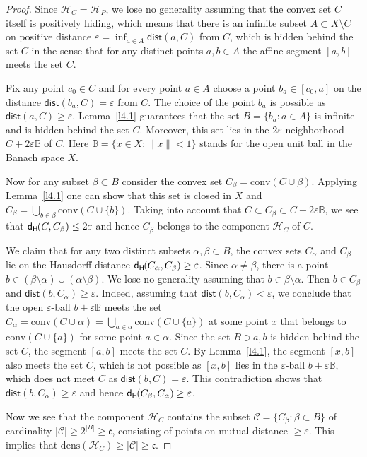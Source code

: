 \documentclass{amsart}
\newcommand{\IB}{\mathbb B}
\newcommand{\e}{\varepsilon}
\newcommand{\HH}{\mathcal H}
\newcommand{\dens}{\mathrm{dens}}
\newcommand{\conv}{\mathrm{conv}}
\newcommand{\dist}{\mathsf{dist}}
\newcommand{\dH}{\mathsf{d}_{\mathsf H}\kern-1pt}
\theoremstyle{definition}
\begin{document}
\begin{proof} Since $\HH_C=\HH_P$, we lose no generality assuming that the convex set $C$ itself is positively hiding, which means that there is an infinite subset $A\subset X\setminus C$ on positive distance $\e=\inf_{a\in A}\dist(a,C)$ from $C$, which is hidden behind the set $C$ in the sense that for any distinct points $a,b\in A$ the affine segment $[a,b]$ meets the set $C$.

Fix any point $c_0\in C$ and for every point $a\in A$ choose a point $b_a\in[c_0,a]$ on the distance $\dist(b_a,C)=\e$ from $C$. The choice of the point $b_a$ is possible as $\dist(a,C)\ge\e$. Lemma~\ref{l4.1} guarantees that the set $B=\{b_a:a\in A\}$ is infinite and is hidden behind the set $C$. Moreover, this set lies in the $2\e$-neighborhood $C+2\e\IB$ of $C$. Here $\IB=\{x\in X:\|x\|< 1\}$ stands for the open unit ball in the Banach space $X$.

Now for any subset $\beta\subset B$ consider the convex set $C_\beta=\conv(C\cup\beta)$. Applying Lemma~\ref{l4.1} one can show that this set is closed in $X$ and  $C_\beta=\bigcup_{b\in\beta}\conv(C\cup\{b\})$. Taking into account that $C\subset C_\beta\subset C+2\e\IB$, we see that $\dH(C,C_\beta)\le 2\e$ and hence $C_\beta$ belongs to the component $\HH_C$ of $C$.

We claim that for any two distinct subsets $\alpha,\beta\subset B$, the convex sets $C_\alpha$ and $C_\beta$ lie on the Hausdorff distance $\dH(C_\alpha,C_\beta)\ge\e$. Since $\alpha\ne\beta$, there is a point $b\in (\beta\setminus\alpha)\cup(\alpha\setminus\beta)$. We lose no generality assuming that $b\in\beta\setminus\alpha$. Then $b\in C_\beta$ and $\dist(b,C_\alpha)\ge\e$. Indeed, assuming that $\dist(b,C_\alpha)<\e$, we conclude that the open $\e$-ball $b+\e\IB$ meets the set $C_\alpha=\conv(C\cup\alpha)=\bigcup_{a\in \alpha}\conv(C\cup\{a\})$ at some point $x$ that belongs to $\conv(C\cup\{a\})$ for some point $a\in\alpha$. Since the set $B\ni a,b$ is hidden behind the set $C$, the segment $[a,b]$ meets the set $C$. By Lemma~\ref{l4.1}, the segment $[x,b]$ also meets the set $C$, which is not possible as $[x,b]$ lies in the $\e$-ball $b+\e \IB$, which does not meet $C$ as $\dist(b,C)=\e$.
This contradiction shows that $\dist(b,C_\alpha)\ge\e$ and hence $\dH(C_\beta,C_\alpha)\ge\e$.

Now we see that the component $\HH_C$ contains the subset $\mathcal C=\{C_\beta:\beta\subset B\}$ of cardinality $|\mathcal C|\ge 2^{|B|}\ge\mathfrak c$, consisting of points on mutual distance $\ge \e$. This implies that $\dens(\HH_C)\ge |\mathcal C|\ge \mathfrak c$.
\end{proof}
\end{document}
